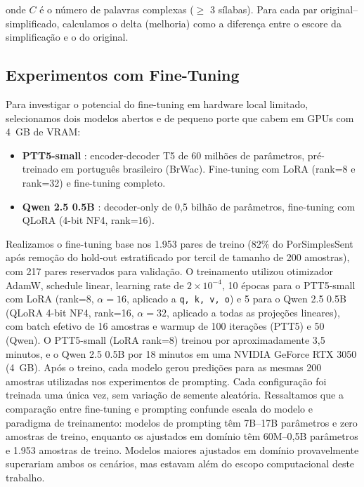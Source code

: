 \documentclass[a4paper, twocolumn, 11pt, twoside]{article}
\begin{document}
onde $C$ é o número de palavras complexas ($\geq$ 3 sílabas).
Para cada par original--simplificado, calculamos o delta (melhoria) como
a diferença entre o escore da simplificação e o do original.

\subsection{Experimentos com Fine-Tuning}

Para investigar o potencial do fine-tuning em hardware local limitado,
selecionamos dois modelos abertos e de pequeno porte que cabem em GPUs
com 4~GB de VRAM:

\begin{itemize}
    \item \textbf{PTT5-small} \citep{carmo2020ptt5}: encoder-decoder T5
        de 60 milhões de parâmetros, pré-treinado em português
        brasileiro (BrWac). Fine-tuning com LoRA (rank=8 e rank=32)
        e fine-tuning completo.
    \item \textbf{Qwen 2.5 0.5B} \citep{bai2023qwen}: decoder-only de 0,5
        bilhão de parâmetros, fine-tuning com QLoRA (4-bit NF4,
        rank=16).
\end{itemize}

Realizamos o fine-tuning base nos 1.953 pares de treino (82\% do
PorSimplesSent após remoção do hold-out estratificado por tercil de tamanho de 200 amostras),
com 217 pares reservados para validação. O treinamento
utilizou otimizador AdamW, schedule linear,
learning rate de $2\times10^{-4}$, 10 épocas para o PTT5-small
com LoRA (rank=8, $\alpha=16$, aplicado a {\tt q, k, v, o})
e 5 para o Qwen 2.5 0.5B (QLoRA 4-bit NF4, rank=16, $\alpha=32$,
aplicado a todas as projeções lineares), com batch efetivo de 16
amostras e warmup de 100 iterações (PTT5) e 50 (Qwen).
O PTT5-small (LoRA rank=8) treinou por aproximadamente 3,5
minutos, e o Qwen 2.5 0.5B por 18 minutos em uma NVIDIA GeForce RTX 3050 (4~GB).
Após o treino, cada modelo gerou predições para as mesmas 200 amostras
utilizadas nos experimentos de prompting. Cada configuração foi treinada
uma única vez, sem variação de semente aleatória. Ressaltamos que a
comparação entre fine-tuning e prompting confunde escala do modelo e
paradigma de treinamento: modelos de prompting têm 7B--17B parâmetros
e zero amostras de treino, enquanto os ajustados em domínio têm 60M--0,5B
parâmetros e 1.953 amostras de treino. Modelos maiores ajustados em domínio
provavelmente superariam ambos os cenários, mas estavam além do
escopo computacional deste trabalho.
\end{document}
